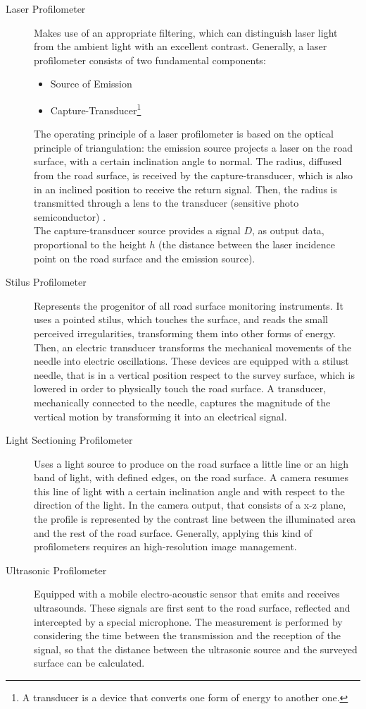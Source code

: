 \documentclass{standalone}
\begin{document}
\begin{description}

\item [Laser Profilometer] Makes use of an appropriate filtering, which can distinguish laser light from the ambient light with an excellent contrast. Generally, a laser profilometer consists of two fundamental components:
\begin{itemize}
\item Source of Emission
\item Capture-Transducer\footnote{A transducer is a device that converts one form of energy to another one.}
\end{itemize}
The operating principle of a laser profilometer is based on the optical principle of triangulation: the emission source projects a laser on the road surface, with a certain inclination angle to normal. The radius, diffused from the road surface, is received by the capture-transducer, which is also in an inclined position to receive the return signal. Then, the radius is transmitted through a lens to the transducer (sensitive photo semiconductor) \cite{amberg1991laser}.\\ The capture-transducer source provides a signal $D$, as output data, proportional to the height $h$ (the distance between the laser incidence point on the road surface and the emission source).
\item [Stilus Profilometer] Represents the progenitor of all road surface monitoring instruments. It uses a pointed stilus, which touches the surface, and reads the small perceived irregularities, transforming them into other forms of energy. Then, an electric transducer transforms the mechanical movements of the needle into electric oscillations. These devices are equipped with a stilust needle, that is in a vertical position respect to the survey surface, which is lowered in order to physically touch the road surface. A transducer, mechanically connected to the needle, captures the magnitude of the vertical motion by transforming it into an electrical signal.
\item [Light Sectioning Profilometer] Uses a light source to produce on the road surface a little line or an high band of light, with defined edges, on the road surface. A camera resumes this line of light with a certain inclination angle and with respect to the direction of the light. In the camera output, that consists of a x-z plane, the profile is represented by the contrast line between the illuminated area and the rest of the road surface. Generally, applying this kind of profilometers requires an high-resolution image management.
\item [Ultrasonic Profilometer] Equipped with a mobile electro-acoustic sensor that emits and receives ultrasounds. These signals are first sent to the road surface, reflected and intercepted by a special microphone. The measurement is performed by considering the time between the transmission and the reception of the signal, so that the distance between the ultrasonic source and the surveyed surface can be calculated\cite{little_book}.

\end{description}
\end{document}
